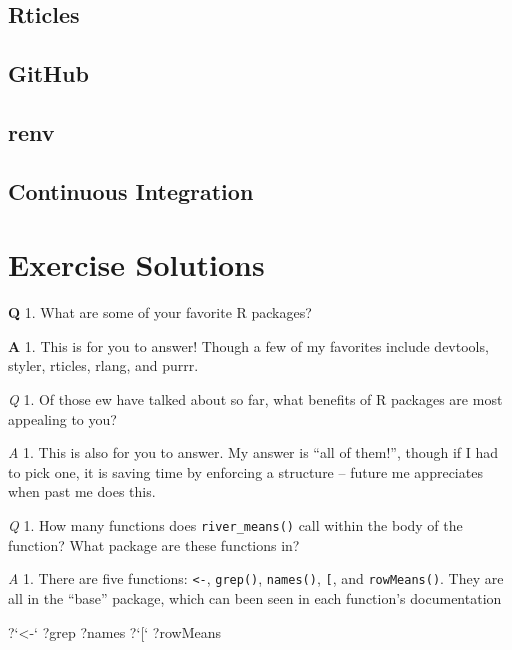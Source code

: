 \documentclass[
]{book}
\newenvironment{Shaded}{\begin{snugshade}}{\end{snugshade}}
\newcommand{\DataTypeTok}[1]{\textcolor[rgb]{0.13,0.29,0.53}{#1}}
\newcommand{\NormalTok}[1]{#1}
\newcommand{\StringTok}[1]{\textcolor[rgb]{0.31,0.60,0.02}{#1}}
\begin{document}
\hypertarget{rticles}{%
\section{Rticles}\label{rticles}}

\hypertarget{github}{%
\section{GitHub}\label{github}}

\hypertarget{renv}{%
\section{renv}\label{renv}}

\hypertarget{continuous-integration}{%
\section{Continuous Integration}\label{continuous-integration}}

\hypertarget{exercise-solutions}{%
\chapter{Exercise Solutions}\label{exercise-solutions}}

\textbf{Q} 1. What are some of your favorite R packages?

\textbf{A} 1. This is for you to answer! Though a few of my favorites include devtools, styler, rticles, rlang, and purrr.

\emph{Q} 1. Of those ew have talked about so far, what benefits of R packages are most appealing to you?

\emph{A} 1. This is also for you to answer. My answer is ``all of them!'', though if I had to pick one, it is saving time by enforcing a structure -- future me appreciates when past me does this.

\emph{Q} 1. How many functions does \texttt{river\_means()} call within the body of the function? What package are these functions in?

\emph{A} 1. There are five functions: \texttt{\textless{}-}, \texttt{grep()}, \texttt{names()}, \texttt{{[}}, and \texttt{rowMeans()}. They are all in the ``base'' package, which can been seen in each function's documentation

\begin{Shaded}
\begin{Highlighting}[]
\NormalTok{?}\StringTok{`}\DataTypeTok{<-}\StringTok{`}
\NormalTok{?grep}
\NormalTok{?names}
\NormalTok{?}\StringTok{`}\DataTypeTok{[}\StringTok{`}
\NormalTok{?rowMeans}
\end{Highlighting}
\end{Shaded}
\end{document}
